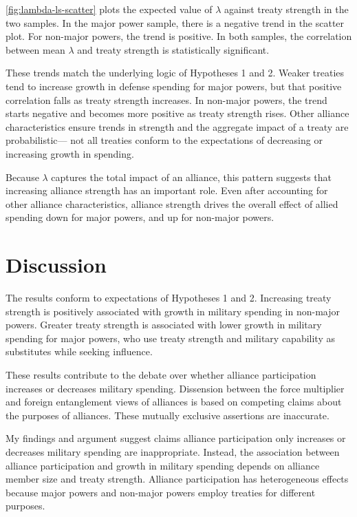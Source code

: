 \documentclass[12pt]{article}
\begin{document}
\autoref{fig:lambda-ls-scatter} plots the expected value of $\lambda$ against treaty strength in the two samples. 
In the major power sample, there is a negative trend in the scatter plot.
For non-major powers, the trend is positive.
In both samples, the correlation between mean $\lambda$ and treaty strength is statistically significant. 


These trends match the underlying logic of Hypotheses 1 and 2. 
Weaker treaties tend to increase growth in defense spending for major powers, but that positive correlation falls as treaty strength increases. 
In non-major powers, the trend starts negative and becomes more positive as treaty strength rises. 
Other alliance characteristics ensure trends in strength and the aggregate impact of a treaty are probabilistic--- not all treaties conform to the expectations of decreasing or increasing growth in spending. 


Because $\lambda$ captures the total impact of an alliance, this pattern suggests that increasing alliance strength has an important role. 
Even after accounting for other alliance characteristics, alliance strength drives the overall effect of allied spending down for major powers, and up for non-major powers. 


\section{Discussion}


The results conform to expectations of Hypotheses 1 and 2. 
Increasing treaty strength is positively associated with growth in military spending in non-major powers. 
Greater treaty strength is associated with lower growth in military spending for major powers, who use treaty strength and military capability as substitutes while seeking influence. 


These results contribute to the debate over whether alliance participation increases or decreases military spending. 
Dissension between the force multiplier and foreign entanglement views of alliances is based on competing claims about the purposes of alliances. 
These mutually exclusive assertions are inaccurate. 


My findings and argument suggest claims alliance participation only increases or decreases military spending are inappropriate. 
Instead, the association between alliance participation and growth in military spending depends on alliance member size and treaty strength. 
Alliance participation has heterogeneous effects because major powers and non-major powers employ treaties for different purposes. 
\end{document}
